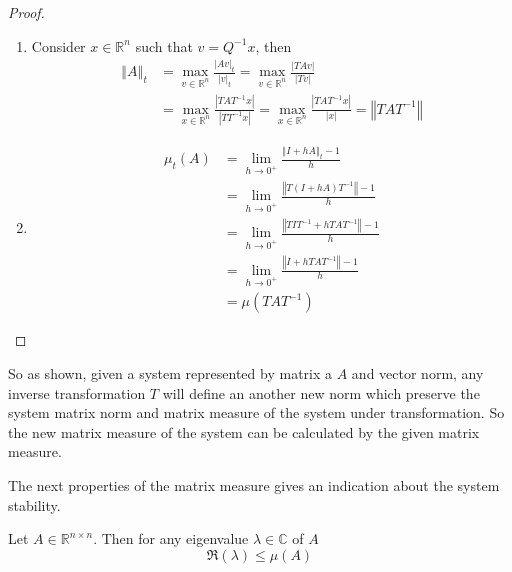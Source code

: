 \documentclass[12pt,English]{article}
\begin{document}
\begin{proof}\hfill
\begin{enumerate}
    \item Consider $x\in\mathbb{R}^{n}$ such that $v=Q^{-1}x$, then
        \begin{align*}
            \left\Vert A\right\Vert _{t} & =\underset{v\in\mathbb{R}^{n}}{\max}\frac{\left|Av\right|_{t}}{\left|v\right|_{t}}
            =\underset{v\in\mathbb{R}^{n}}{\max}\frac{\left|TAv\right|}{\left|Tv\right|}\\
            &=\underset{x\in\mathbb{R}^{n}}{\max}\frac{\left|TAT^{-1}x\right|}{\left|TT^{-1}x\right|}
            =\underset{x\in\mathbb{R}^{n}}{\max}\frac{\left|TAT^{-1}x\right|}{\left|x\right|}
            =\left\Vert TAT^{-1}\right\Vert 
    \end{align*}
    \item 
    \begin{align*}
        \mu_{t}\left(A\right) & =\lim_{h\rightarrow0^{+}}\frac{\left\Vert I+hA\right\Vert _{t}-1}{h}\\
         & =\lim_{h\rightarrow0^{+}}\frac{\left\Vert T\left(I+hA\right)T^{-1}\right\Vert -1}{h}\\
         & =\lim_{h\rightarrow0^{+}}\frac{\left\Vert TIT^{-1}+hTAT^{-1}\right\Vert -1}{h}\\
         & =\lim_{h\rightarrow0^{+}}\frac{\left\Vert I+hTAT^{-1}\right\Vert -1}{h}\\
         & =\mu\left(TAT^{-1}\right)
\end{align*}
\end{enumerate}
\end{proof}

So as shown, given a system represented by matrix a $A$ and vector norm, any inverse transformation $T$ will define an another new norm which preserve the system matrix norm and matrix measure of the system under transformation. So the new matrix measure of the system can be calculated by the given matrix measure. 



The next properties of the matrix measure gives an indication about the system stability.
\begin{lem}
Let $A\in\mathbb{R}^{n\times n}$. Then for any eigenvalue $\lambda\in\mathbb{C}$ of $A$
\begin{equation}
    \Re\left(\lambda\right)\leq\mu\left(A\right)
\end{equation}
\end{lem}
\end{document}
